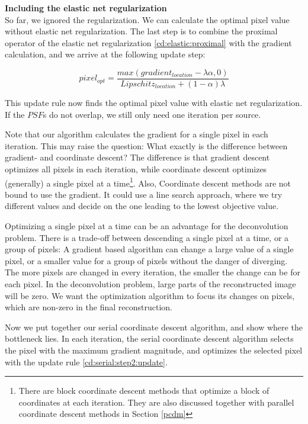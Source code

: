 \textbf{Including the elastic net regularization}\\
So far, we ignored the regularization. We can calculate the optimal pixel value without elastic net regularization. The last step is to combine the proximal operator of the elastic net regularization \eqref{cd:elastic:proximal} with the gradient calculation, and we arrive at the following update step:

\begin{equation} \label{cd:serial:step2:update}
pixel_{opt} = \frac{max(gradient_{location} - \lambda\alpha, 0)}{Lipschitz_{location} + (1 - \alpha)\lambda}
\end{equation}

This update rule now finds the optimal pixel value with elastic net regularization. If the $PSF$s do not overlap, we still only need one iteration per source.

Note that our algorithm calculates the gradient for a single pixel in each iteration. This may raise the question: What exactly is the difference between gradient- and coordinate descent? The difference is that gradient descent optimizes all pixels in each iteration, while coordinate descent optimizes (generally) a single pixel at a time\footnote{There are block coordinate descent methods that optimize a block of coordinates at each iteration. They are also discussed together with parallel coordinate descent methods in Section \ref{pcdm}}. Also, Coordinate descent methods are not bound to use the gradient. It could use a line search approach, where we try different values and decide on the one leading to the lowest objective value.

Optimizing a single pixel at a time can be an advantage for the deconvolution problem. There is a trade-off between descending a single pixel at a time, or a group of pixels: A gradient based algorithm can change a large value of a single pixel, or a smaller value for a group of pixels without the danger of diverging. The more pixels are changed in every iteration, the smaller the change can be for each pixel. In the deconvolution problem, large parts of the reconstructed image will be zero. We want the optimization algorithm to focus its changes on pixels, which are non-zero in the final reconstruction.

Now we put together our serial coordinate descent algorithm, and show where the bottleneck lies. In each iteration, the serial coordinate descent algorithm selects the pixel with the maximum gradient magnitude, and optimizes the selected pixel with the update rule \eqref{cd:serial:step2:update}.

